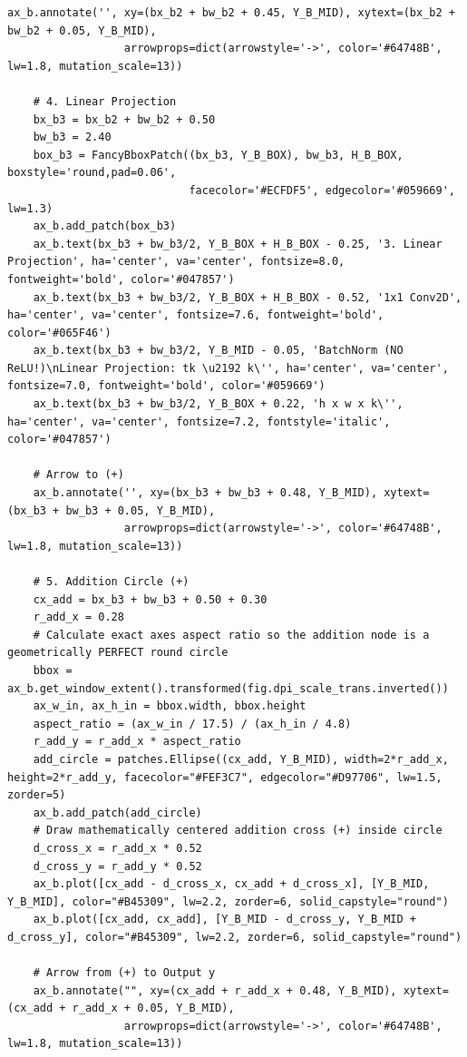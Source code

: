 \begin{lstlisting}[style=pycode]
    ax_b.annotate('', xy=(bx_b2 + bw_b2 + 0.45, Y_B_MID), xytext=(bx_b2 + bw_b2 + 0.05, Y_B_MID),
                  arrowprops=dict(arrowstyle='->', color='#64748B', lw=1.8, mutation_scale=13))

    # 4. Linear Projection
    bx_b3 = bx_b2 + bw_b2 + 0.50
    bw_b3 = 2.40
    box_b3 = FancyBboxPatch((bx_b3, Y_B_BOX), bw_b3, H_B_BOX, boxstyle='round,pad=0.06',
                            facecolor='#ECFDF5', edgecolor='#059669', lw=1.3)
    ax_b.add_patch(box_b3)
    ax_b.text(bx_b3 + bw_b3/2, Y_B_BOX + H_B_BOX - 0.25, '3. Linear Projection', ha='center', va='center', fontsize=8.0, fontweight='bold', color='#047857')
    ax_b.text(bx_b3 + bw_b3/2, Y_B_BOX + H_B_BOX - 0.52, '1x1 Conv2D', ha='center', va='center', fontsize=7.6, fontweight='bold', color='#065F46')
    ax_b.text(bx_b3 + bw_b3/2, Y_B_MID - 0.05, 'BatchNorm (NO ReLU!)\nLinear Projection: tk \u2192 k\'', ha='center', va='center', fontsize=7.0, fontweight='bold', color='#059669')
    ax_b.text(bx_b3 + bw_b3/2, Y_B_BOX + 0.22, 'h x w x k\'', ha='center', va='center', fontsize=7.2, fontstyle='italic', color='#047857')

    # Arrow to (+)
    ax_b.annotate('', xy=(bx_b3 + bw_b3 + 0.48, Y_B_MID), xytext=(bx_b3 + bw_b3 + 0.05, Y_B_MID),
                  arrowprops=dict(arrowstyle='->', color='#64748B', lw=1.8, mutation_scale=13))

    # 5. Addition Circle (+)
    cx_add = bx_b3 + bw_b3 + 0.50 + 0.30
    r_add_x = 0.28
    # Calculate exact axes aspect ratio so the addition node is a geometrically PERFECT round circle
    bbox = ax_b.get_window_extent().transformed(fig.dpi_scale_trans.inverted())
    ax_w_in, ax_h_in = bbox.width, bbox.height
    aspect_ratio = (ax_w_in / 17.5) / (ax_h_in / 4.8)
    r_add_y = r_add_x * aspect_ratio
    add_circle = patches.Ellipse((cx_add, Y_B_MID), width=2*r_add_x, height=2*r_add_y, facecolor="#FEF3C7", edgecolor="#D97706", lw=1.5, zorder=5)
    ax_b.add_patch(add_circle)
    # Draw mathematically centered addition cross (+) inside circle
    d_cross_x = r_add_x * 0.52
    d_cross_y = r_add_y * 0.52
    ax_b.plot([cx_add - d_cross_x, cx_add + d_cross_x], [Y_B_MID, Y_B_MID], color="#B45309", lw=2.2, zorder=6, solid_capstyle="round")
    ax_b.plot([cx_add, cx_add], [Y_B_MID - d_cross_y, Y_B_MID + d_cross_y], color="#B45309", lw=2.2, zorder=6, solid_capstyle="round")

    # Arrow from (+) to Output y
    ax_b.annotate("", xy=(cx_add + r_add_x + 0.48, Y_B_MID), xytext=(cx_add + r_add_x + 0.05, Y_B_MID),
                  arrowprops=dict(arrowstyle='->', color='#64748B', lw=1.8, mutation_scale=13))


\end{lstlisting}
